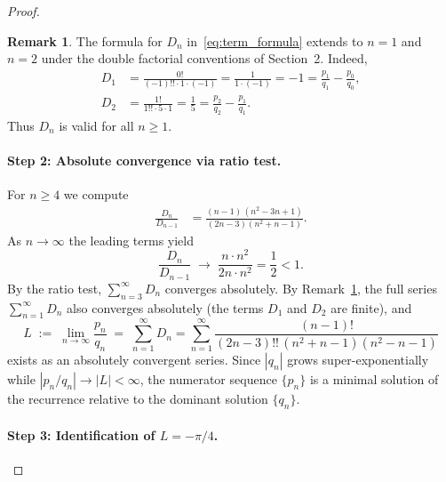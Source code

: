 \documentclass[11pt,reqno]{amsart}
\theoremstyle{definition}
\newtheorem{remark}[theorem]{Remark}
\begin{document}
\begin{proof}
\begin{remark}\label{rem:unified}
The formula for $D_n$ in~\eqref{eq:term_formula} extends to $n=1$ and $n=2$ under the double factorial conventions of Section~2. Indeed,
\begin{align*}
  D_1 &= \frac{0!}{(-1)!!\cdot 1\cdot(-1)} = \frac{1}{1\cdot(-1)} = -1 = \frac{p_1}{q_1}-\frac{p_0}{q_0}, \\
  D_2 &= \frac{1!}{1!!\cdot 5\cdot 1} = \frac{1}{5} = \frac{p_2}{q_2}-\frac{p_1}{q_1}.
\end{align*}
Thus $D_n$ is valid for all $n\ge 1$.
\end{remark}

\paragraph{Step 2: Absolute convergence via ratio test.}

For $n\ge 4$ we compute
\begin{align*}
  \frac{D_n}{D_{n-1}}
  &= \frac{(n-1)\,(n^2-3n+1)}{(2n-3)(n^2+n-1)}.
\end{align*}
As $n\to\infty$ the leading terms yield
\begin{equation}\label{eq:ratio_limit}
  \frac{D_n}{D_{n-1}}
  \;\longrightarrow\; \frac{n\cdot n^2}{2n\cdot n^2}
  = \frac{1}{2} < 1.
\end{equation}
By the ratio test, $\sum_{n=3}^{\infty}D_n$ converges absolutely. By Remark~\ref{rem:unified}, the full series $\sum_{n=1}^{\infty}D_n$ also converges absolutely (the terms $D_1$ and $D_2$ are finite), and
\begin{equation}\label{eq:limit_series}
  L \;:=\; \lim_{n\to\infty}\frac{p_n}{q_n}
  \;=\; \sum_{n=1}^{\infty}D_n = \sum_{n=1}^{\infty} \frac{(n-1)!}{(2n-3)!!\,(n^2+n-1)(n^2-n-1)}
\end{equation}
exists as an absolutely convergent series.  Since $|q_n|$ grows super-exponentially while $|p_n/q_n|\to|L|<\infty$, the numerator sequence $\{p_n\}$ is a minimal solution of the recurrence relative to the dominant solution $\{q_n\}$.

\paragraph{Step 3: Identification of $L = -\pi/4$.}


\end{proof}
\end{document}
